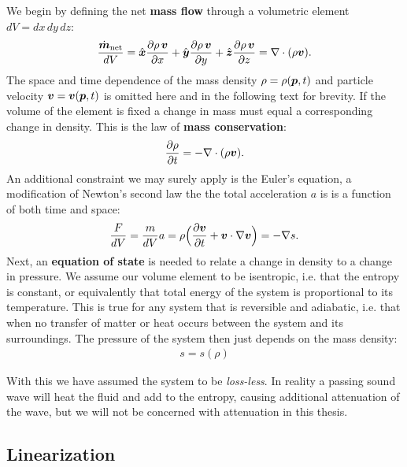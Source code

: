 We begin by defining the net \textbf{mass flow} through a volumetric element $dV = dx\,dy\,dz$:
%
\begin{align}
\frac{\dot{\boldsymbol{m}}_\text{net}}{dV} = \hat{\boldsymbol{x}}\frac{\partial \rho\,\boldsymbol{v}}{\partial x} + \hat{\boldsymbol{y}}\frac{\partial \rho\,\boldsymbol{v}}{\partial y} + \hat{\boldsymbol{z}}\frac{\partial \rho\,\boldsymbol{v}}{\partial z} = \nabla \cdot (\rho\boldsymbol{v}).
\end{align}
%
The space and time dependence of the mass density $\rho = \rho(\boldsymbol{p},t)$ and particle velocity $\boldsymbol{v} = \boldsymbol{v}(\boldsymbol{p},t)$ is omitted here and in the following text for brevity. If the volume of the element is fixed a change in mass must equal a corresponding change in density. This is the law of \textbf{mass conservation}:
%
\begin{align}
\frac{\partial\rho}{\partial t} = -\nabla \cdot (\rho\boldsymbol{v}). \label{wave_eq_mass_conservation}
\end{align}
%
An additional constraint we may surely apply is the Euler's equation, a modification of Newton's second law the the total acceleration $a$ is is a function of both time and space:
%
\begin{align}
\frac{F}{dV} = \frac{m}{dV} a = \rho\Big(\frac{\partial\boldsymbol{v}}{\partial t} + \boldsymbol{v}\cdot\nabla\boldsymbol{v}\Big) = -\nabla s. \label{wave_eq_euler}
\end{align}
%
Next, an \textbf{equation of state} is needed to relate a change in density to a change in pressure. We assume our volume element to be isentropic, i.e. that the entropy is constant, or equivalently that total energy of the system is proportional to its temperature. This is true for any system that is reversible and adiabatic, i.e. that when no transfer of matter or heat occurs between the system and its surroundings. The pressure of the system then just depends on the mass density:
%
\begin{align}
s = s(\rho) \label{wave_eq_sound_pressure}
\end{align}

With this we have assumed the system to be \emph{loss-less}. In reality a passing sound wave will heat the fluid and add to the entropy, causing additional attenuation of the wave, but we will not be concerned with attenuation in this thesis.

\subsection{Linearization}


